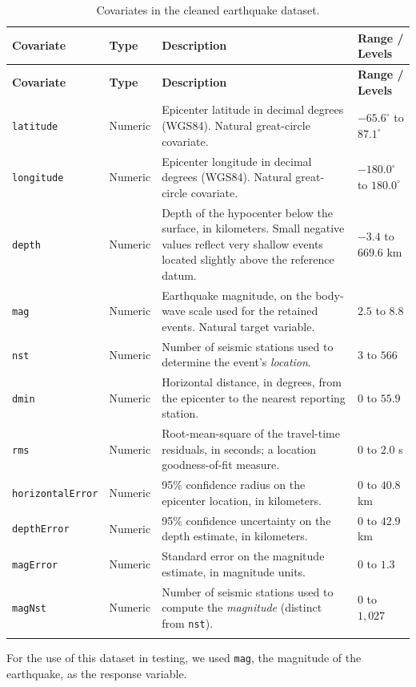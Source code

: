 \documentclass[11pt,twoside,a4paper]{article}
\begin{document}
\begin{longtable}{p{2.6cm}p{1.6cm}p{6.3cm}p{3.5cm}}
\toprule
\textbf{Covariate} & \textbf{Type} & \textbf{Description} & \textbf{Range / Levels} \\
\midrule
\endfirsthead
\toprule
\textbf{Covariate} & \textbf{Type} & \textbf{Description} & \textbf{Range / Levels} \\
\midrule
\endhead

\texttt{latitude} & Numeric & Epicenter latitude in decimal degrees (WGS84). Natural great-circle covariate. & $-65.6^{\circ}$ to $87.1^{\circ}$ \\
\addlinespace
\texttt{longitude} & Numeric & Epicenter longitude in decimal degrees (WGS84). Natural great-circle covariate. & $-180.0^{\circ}$ to $180.0^{\circ}$ \\
\addlinespace
\texttt{depth} & Numeric & Depth of the hypocenter below the surface, in kilometers. Small negative values reflect very shallow events located slightly above the reference datum. & $-3.4$ to $669.6$ km \\
\addlinespace
\texttt{mag} & Numeric & Earthquake magnitude, on the body-wave scale used for the retained events. Natural target variable. & $2.5$ to $8.8$ \\
\addlinespace
\texttt{nst} & Numeric & Number of seismic stations used to determine the event's \emph{location}. & $3$ to $566$ \\
\addlinespace
\texttt{dmin} & Numeric & Horizontal distance, in degrees, from the epicenter to the nearest reporting station. & $0$ to $55.9$ \\
\addlinespace
\texttt{rms} & Numeric & Root-mean-square of the travel-time residuals, in seconds; a location goodness-of-fit measure. & $0$ to $2.0$ s \\
\addlinespace
\texttt{horizontalError} & Numeric & 95\% confidence radius on the epicenter location, in kilometers. & $0$ to $40.8$ km \\
\addlinespace
\texttt{depthError} & Numeric & 95\% confidence uncertainty on the depth estimate, in kilometers. & $0$ to $42.9$ km \\
\addlinespace
\texttt{magError} & Numeric & Standard error on the magnitude estimate, in magnitude units. & $0$ to $1.3$ \\
\addlinespace
\texttt{magNst} & Numeric & Number of seismic stations used to compute the \emph{magnitude} (distinct from \texttt{nst}). & $0$ to $1{,}027$ \\
\addlinespace
\bottomrule
\caption{Covariates in the cleaned earthquake dataset.}
\label{tab:covariates}
\end{longtable}
For the use of this dataset in testing, we used \texttt{mag}, the magnitude of the earthquake, as the response variable.
\end{document}
